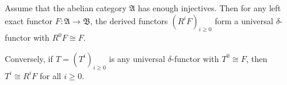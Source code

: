 Assume that the abelian category $\mathfrak{A}$ has enough injectives. Then for any left exact functor $F: \mathfrak{A} \to \mathfrak{B}$, the derived functors $(R^i F)_{i \geqslant 0}$ form a universal $\delta$-functor with $R^0 F \cong F$.

Conversely, if $T = (T^i)_{i \geqslant 0}$ is any universal $\delta$-functor with $T^0 \cong F$, then $T^i \cong R^i F$ for all $i \geqslant 0$.
